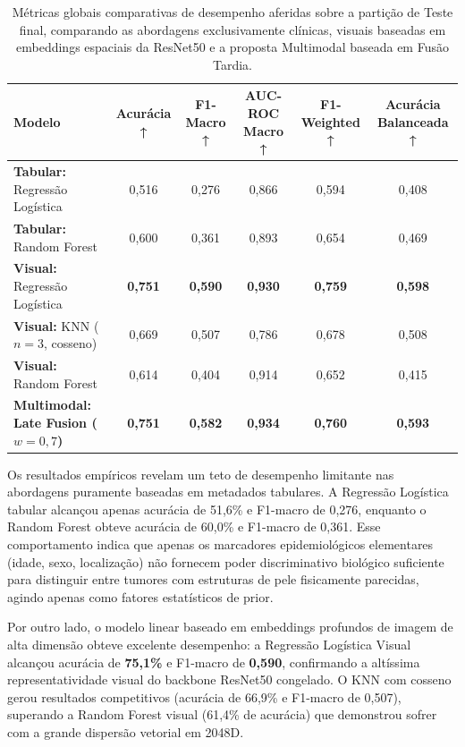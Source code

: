 \documentclass[10pt,twocolumn,letterpaper]{article}
\begin{document}
\begin{table}[t]
  \centering
  \begin{tabular}{@{}lccccc@{}}
    \toprule
    Modelo & Acurácia ↑ & F1-Macro ↑ & AUC-ROC Macro ↑ & F1-Weighted ↑ & Acurácia Balanceada ↑ \\
    \midrule
    \textbf{Tabular:} Regressão Logística & 0,516 & 0,276 & 0,866 & 0,594 & 0,408 \\
    \textbf{Tabular:} Random Forest & 0,600 & 0,361 & 0,893 & 0,654 & 0,469 \\
    \midrule
    \textbf{Visual:} Regressão Logística & \textbf{0,751} & \textbf{0,590} & \textbf{0,930} & \textbf{0,759} & \textbf{0,598} \\
    \textbf{Visual:} KNN ($n=3$, cosseno) & 0,669 & 0,507 & 0,786 & 0,678 & 0,508 \\
    \textbf{Visual:} Random Forest & 0,614 & 0,404 & 0,914 & 0,652 & 0,415 \\
    \midrule
    \textbf{Multimodal: Late Fusion ($w=0,7$)} & \textbf{0,751} & \textbf{0,582} & \textbf{0,934} & \textbf{0,760} & \textbf{0,593} \\
    \bottomrule
  \end{tabular}
  \caption{Métricas globais comparativas de desempenho aferidas sobre a partição de Teste final, comparando as abordagens exclusivamente clínicas, visuais baseadas em embeddings espaciais da ResNet50 e a proposta Multimodal baseada em Fusão Tardia.}
  \label{tab:performance_results}
\end{table}

Os resultados empíricos revelam um teto de desempenho limitante nas abordagens puramente baseadas em metadados tabulares. A Regressão Logística tabular alcançou apenas acurácia de 51,6\% e F1-macro de 0,276, enquanto o Random Forest obteve acurácia de 60,0\% e F1-macro de 0,361. Esse comportamento indica que apenas os marcadores epidemiológicos elementares (idade, sexo, localização) não fornecem poder discriminativo biológico suficiente para distinguir entre tumores com estruturas de pele fisicamente parecidas, agindo apenas como fatores estatísticos de prior.

Por outro lado, o modelo linear baseado em embeddings profundos de imagem de alta dimensão obteve excelente desempenho: a Regressão Logística Visual alcançou acurácia de \textbf{75,1\%} e F1-macro de \textbf{0,590}, confirmando a altíssima representatividade visual do backbone ResNet50 congelado. O KNN com cosseno gerou resultados competitivos (acurácia de 66,9\% e F1-macro de 0,507), superando a Random Forest visual (61,4\% de acurácia) que demonstrou sofrer com a grande dispersão vetorial em 2048D.
\end{document}

